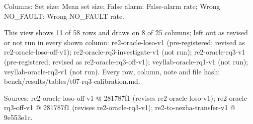 \begin{table}[t]
Columns: Set size: Mean set size; False alarm: False-alarm rate; Wrong NO\_FAULT: Wrong NO\_FAULT rate.\par
This view shows 11 of 58 rows and draws on 8 of 25 columns; left out as revised or not run in every shown column: re2-oracle-loso-v1 (pre-registered; revised as re2-oracle-loso-off-v1); re2-oracle-rq3-investigate-v1 (not run); re2-oracle-rq3-v1 (pre-registered; revised as re2-oracle-rq3-off-v1); veyllab-oracle-rq1-v1 (not run); veyllab-oracle-rq2-v1 (not run). Every row, column, note and file hash: bench/\allowbreak{}results/\allowbreak{}tables/\allowbreak{}t07-rq3-calibration.md.\par
Sources: re2-oracle-loso-off-v1 @ 281787f1 (revises re2-oracle-loso-v1); re2-oracle-rq3-off-v1 @ 281787f1 (revises re2-oracle-rq3-v1); re2-to-nezha-transfer-v1 @ 9e553e1c.\par
\end{table}
